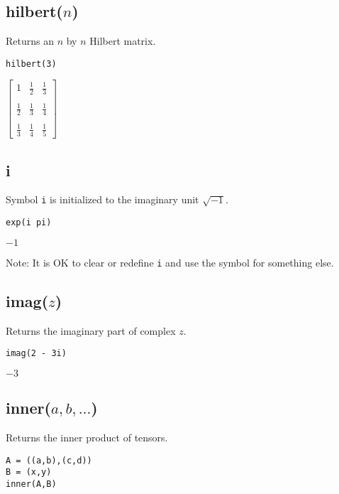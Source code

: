 \subsection*{hilbert($n$)}

Returns an $n$ by $n$ Hilbert matrix.

{\color{blue}
\begin{verbatim}
hilbert(3)
\end{verbatim}
}

\noindent
$\displaystyle
\begin{bmatrix}
1 & \tfrac{1}{2} & \tfrac{1}{3}\\ \\
\tfrac{1}{2} & \tfrac{1}{3} & \tfrac{1}{4}\\ \\
\tfrac{1}{3} & \tfrac{1}{4} & \tfrac{1}{5}
\end{bmatrix}
$

\subsection*{i}

Symbol {\tt i} is initialized to the imaginary unit $\sqrt{-1}$.

{\color{blue}
\begin{verbatim}
exp(i pi)
\end{verbatim}
}

\noindent
$-1$

\bigskip
\noindent
Note: It is OK to clear or redefine {\tt i} and use the symbol for something else.

\subsection*{imag($z$)}

Returns the imaginary part of complex $z$.

{\color{blue}
\begin{verbatim}
imag(2 - 3i)
\end{verbatim}
}

\noindent
$-3$

\subsection*{inner($a,b,\ldots$)}

Returns the inner product of tensors.

{\color{blue}
\begin{verbatim}
A = ((a,b),(c,d))
B = (x,y)
inner(A,B)
\end{verbatim}
}

